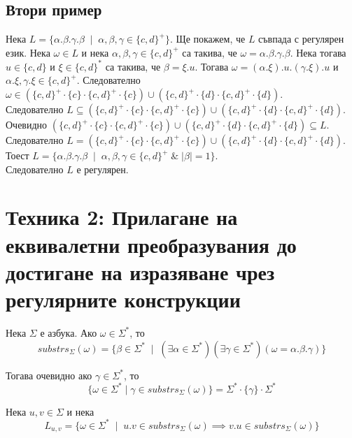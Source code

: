 \documentclass[12pt]{article}
\begin{document}
\subsection*{Втори пример}
Нека \(L = \{\alpha.\beta.\gamma.\beta \;\mid\; \alpha, \beta, \gamma \in \{c, d\}^+\}\).
Ще покажем, че \(L\) съвпада с регулярен език.
Нека \(\omega \in L\) и нека \(\alpha, \beta, \gamma \in \{c, d\}^+\) са такива, че \(\omega = \alpha.\beta.\gamma.\beta\).
Нека тогава \(u \in \{c, d\}\) и \(\xi\in \{c, d\}^*\) са такива, че \(\beta = \xi.u\).
Тогава \(\omega = (\alpha.\xi).u.(\gamma.\xi).u\) и \(\alpha.\xi, \gamma.\xi \in \{c, d\}^+\).
Следователно \\
\(\omega \in (\{c, d\}^+ \cdot \{c\}\cdot\{c, d\}^+ \cdot \{c\}) \cup (\{c, d\}^+ \cdot \{d\} \cdot \{c, d\}^+ \cdot \{d\})\). \\
Следователно \(L \subseteq (\{c, d\}^+ \cdot \{c\}\cdot\{c, d\}^+ \cdot \{c\}) \cup (\{c, d\}^+ \cdot \{d\} \cdot \{c, d\}^+ \cdot \{d\})\). \\
Очевидно
\((\{c, d\}^+ \cdot \{c\}\cdot\{c, d\}^+ \cdot \{c\}) \cup (\{c, d\}^+ \cdot \{d\} \cdot \{c, d\}^+ \cdot \{d\}) \subseteq L\). \\
Следователно \(L = (\{c, d\}^+ \cdot \{c\}\cdot\{c, d\}^+ \cdot \{c\}) \cup (\{c, d\}^+ \cdot \{d\} \cdot \{c, d\}^+ \cdot \{d\})\). \\
Тоест \(L = \{\alpha.\beta.\gamma.\beta \;\mid\; \alpha, \beta, \gamma \in \{c, d\}^+ \;\&\; |\beta| = 1\}\). \\
Следователно \(L\) е регулярен.

\section*{Техника 2: Прилагане на еквивалетни преобразувания до достигане на изразяване чрез регулярните конструкции}
Нека \(\Sigma\) е азбука.
Ако \(\omega \in \Sigma^*\), то \[substrs_\Sigma(\omega) = \{\beta \in \Sigma^* \;\mid\; (\exists \alpha \in \Sigma^*)(\exists \gamma \in \Sigma^*)(\omega = \alpha.\beta.\gamma)\}\]

Тогава очевидно ако \(\gamma \in \Sigma^*\), то \[\{\omega \in \Sigma^* \mid \gamma\in substrs_\Sigma(\omega)\} = \Sigma^* \cdot \{\gamma\} \cdot \Sigma^*\]

\vspace*{5mm}

\par Нека \(u, v \in \Sigma\) и нека
\[L_{u,v} = \{\omega \in \Sigma^* \;\mid\; u.v \in substrs_\Sigma(\omega)  \implies v.u \in substrs_\Sigma(\omega)\}\]
\end{document}
